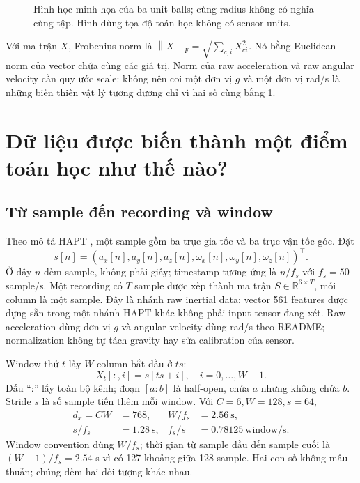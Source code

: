 \documentclass[11pt,a4paper]{article}
\newcommand{\R}{\mathbb R}
\newcommand{\norm}[1]{\left\lVert#1\right\rVert}
\theoremstyle{definition}
\begin{document}
\begin{figure}[!htbp]\centering
{}
\caption{Hình học minh họa của ba unit balls; cùng radius không có nghĩa
cùng tập. Hình dùng tọa độ toán học không có sensor units.}
\end{figure}

Với ma trận $X$, Frobenius norm là
$\norm{X}_F=\sqrt{\sum_{c,i}X_{ci}^2}$. Nó bằng Euclidean norm của vector
chứa cùng các giá trị. Norm của raw acceleration và raw angular velocity
cần quy ước scale: không nên coi một đơn vị $g$ và một đơn vị rad/s là
những biến thiên vật lý tương đương chỉ vì hai số cùng bằng 1.

\section{Dữ liệu được biến thành một điểm toán học như thế nào?}
\subsection{Từ sample đến recording và window}
Theo mô tả HAPT \cite{hapt}, một sample gồm ba trục gia tốc và ba trục vận
tốc góc. Đặt
\begin{equation}
s[n]=(a_x[n],a_y[n],a_z[n],\omega_x[n],\omega_y[n],\omega_z[n])^\top.
\end{equation}
Ở đây $n$ đếm sample, không phải giây; timestamp tương ứng là $n/f_s$ với
$f_s=50$ sample/s. Một recording có $T$ sample được xếp thành ma trận
$S\in\R^{6\times T}$, mỗi column là một sample. Đây là nhánh raw inertial
data; vector 561 features được dựng sẵn trong một nhánh HAPT khác không
phải input tensor đang xét. Raw acceleration dùng đơn vị $g$ và angular
velocity dùng rad/s theo README; normalization không tự tách gravity hay
sửa calibration của sensor.

Window thứ $t$ lấy $W$ column bắt đầu ở $ts$:
\begin{equation}
X_t[:,i]=s[ts+i],\quad i=0,\ldots,W-1.
\label{eq:window}
\end{equation}
Dấu ``:'' lấy toàn bộ kênh; đoạn $[a:b]$ là half-open, chứa $a$ nhưng không
chứa $b$. Stride $s$ là số sample tiến thêm mỗi window. Với $C=6,W=128,s=64$,
\begin{align}
d_x=CW&=768, & W/f_s&=2.56\ \mathrm{s},\\
s/f_s&=1.28\ \mathrm{s}, & f_s/s&=0.78125\ \text{window/s}.
\end{align}
Window convention dùng $W/f_s$; thời gian từ sample đầu đến sample cuối là
$(W-1)/f_s=2.54$ s vì có 127 khoảng giữa 128 sample. Hai con số không mâu
thuẫn; chúng đếm hai đối tượng khác nhau.
\end{document}
